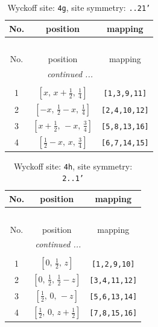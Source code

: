 \documentclass[fleqn,8pt]{jsarticle}
\begin{document}
\renewcommand{\arraystretch}{1.2}
\begin{longtable}{ccc}
\caption{Wyckoff site: {\tt 4g}, site symmetry: {\tt ..21'}}
 \\
 \hline \hline
No. & position & mapping \\ \hline \endfirsthead

\multicolumn{2}{l}{\tablename\ \thetable{}} \\
 \hline \hline
No. & position & mapping \\ \hline \endhead

 \hline \hline
\multicolumn{2}{r}{\footnotesize\it continued ...} \\ \endfoot

 \hline \hline
\multicolumn{2}{r}{} \\ \endlastfoot

1 & $\left[ x,\, x + \frac{1}{2},\, \frac{1}{4} \right]$ & {\tt [1,3,9,11]} \\ \hline
2 & $\left[ - x,\, \frac{1}{2} - x,\, \frac{1}{4} \right]$ & {\tt [2,4,10,12]} \\ \hline
3 & $\left[ x + \frac{1}{2},\, - x,\, \frac{3}{4} \right]$ & {\tt [5,8,13,16]} \\ \hline
4 & $\left[ \frac{1}{2} - x,\, x,\, \frac{3}{4} \right]$ & {\tt [6,7,14,15]} \\
\end{longtable}
\renewcommand{\arraystretch}{1.2}
\begin{longtable}{ccc}
\caption{Wyckoff site: {\tt 4h}, site symmetry: {\tt 2..1'}}
 \\
 \hline \hline
No. & position & mapping \\ \hline \endfirsthead

\multicolumn{2}{l}{\tablename\ \thetable{}} \\
 \hline \hline
No. & position & mapping \\ \hline \endhead

 \hline \hline
\multicolumn{2}{r}{\footnotesize\it continued ...} \\ \endfoot

 \hline \hline
\multicolumn{2}{r}{} \\ \endlastfoot

1 & $\left[ 0,\, \frac{1}{2},\, z \right]$ & {\tt [1,2,9,10]} \\ \hline
2 & $\left[ 0,\, \frac{1}{2},\, \frac{1}{2} - z \right]$ & {\tt [3,4,11,12]} \\ \hline
3 & $\left[ \frac{1}{2},\, 0,\, - z \right]$ & {\tt [5,6,13,14]} \\ \hline
4 & $\left[ \frac{1}{2},\, 0,\, z + \frac{1}{2} \right]$ & {\tt [7,8,15,16]} \\
\end{longtable}
\end{document}
